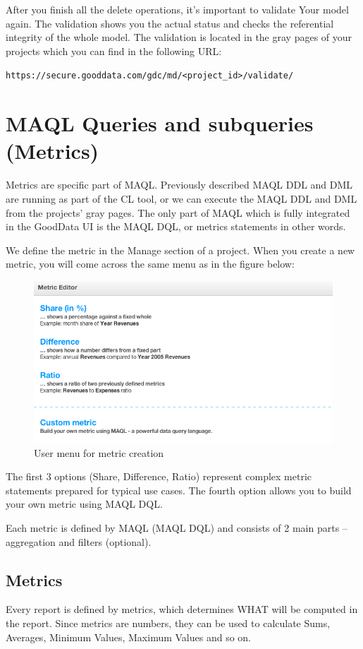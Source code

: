 \documentclass[a4paper, 12pt, titlepage, fleqn]{article}
\begin{document}
After you finish all the delete operations, it's important to validate Your model again. The validation shows you the actual status and checks the referential integrity of the whole model. The validation is located in the gray pages of your projects which you can find in the following URL:

\verb=https://secure.gooddata.com/gdc/md/<project_id>/validate/=

\section{MAQL Queries and subqueries (Metrics)}
\label{metrics}
Metrics are specific part of MAQL. Previously described MAQL DDL and DML are running as part of the CL tool, or we can execute the MAQL DDL and DML from the projects' gray pages. The only part of MAQL which is fully integrated in the GoodData UI is the MAQL DQL, or metrics statements in other words.

We define the metric in the Manage section of a project. When you create a new metric, you will come across the same menu as in the figure below:

\begin{figure}[htb]
\centering
\includegraphics[scale=0.4]{images/metricmenu.png}
\caption{User menu for metric creation}
\label{fig:umm}
\end{figure}

The first 3 options (Share, Difference, Ratio) represent complex metric statements prepared for typical use cases. The fourth option allows you to build your own metric using MAQL DQL.

Each metric is defined by MAQL (MAQL DQL) and consists of 2 main parts -- aggregation and filters (optional).

\subsection{Metrics}
Every report is defined by metrics, which determines WHAT will be computed in the report. Since metrics are numbers, they can be used to calculate Sums, Averages, Minimum Values, Maximum Values and so on.
\end{document}
